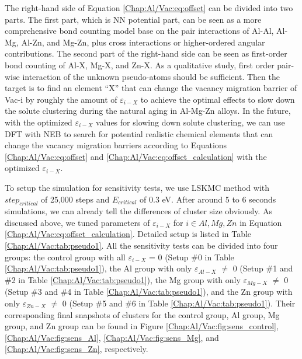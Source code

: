 The right-hand side of Equation \ref{Chap:Al/Vac:eq:offset} can be divided into two parts. The first part, which is \ac{NN} potential part, can be seen as a more comprehensive bond counting model \cite{soisson1996monte} base on the pair interactions of Al-Al, Al-Mg, Al-Zn, and Mg-Zn, plus cross interactions or higher-ordered angular contributions. The second part of the right-hand side can be seen as first-order bond counting of Al-X, Mg-X, and Zn-X. As a qualitative study, first order pair-wise interaction of the unknown pseudo-atoms should be sufficient. Then the target is to find an element ``X'' that can change the vacancy migration barrier of Vac-i by roughly the amount of $\varepsilon_{i-X}$ to achieve the optimal effects to slow down the solute clustering during the natural aging in Al-Mg-Zn alloys. In the future, with the optimized $\varepsilon_{i-X}$ values for slowing down solute clustering, we can use \ac{DFT} with \ac{NEB} to search for potential realistic chemical elements that can change the vacancy migration barriers according to Equations \ref{Chap:Al/Vac:eq:offset} and \ref{Chap:Al/Vac:eq:offset_calculation} with the optimized $\varepsilon_{i-X}$.

To setup the simulation for sensitivity tests, we use \ac{LSKMC} method with $step_{critical}$ of 25,000 steps and $E_{critical}$ of 0.3 eV. After around 5 to 6 seconds simulations, we can already tell the differences of cluster size obviously. As discussed above, we tuned parameters of $\varepsilon_{i-X}$ for $i \in {Al, Mg, Zn}$ in Equation \ref{Chap:Al/Vac:eq:offset_calculation}. Detailed setup is listed in Table \ref{Chap:Al/Vac:tab:pseudo1}. All the sensitivity tests can be divided into four groups: the control group with all $\varepsilon_{i-X}$ = 0 (Setup \#0 in Table \ref{Chap:Al/Vac:tab:pseudo1}), the Al group with only $\varepsilon_{Al-X}$ $\ne$ 0 (Setup \#1 and \#2 in Table \ref{Chap:Al/Vac:tab:pseudo1}), the Mg group with only $\varepsilon_{Mg-X}$ $\ne$ 0 (Setup \#3 and \#4 in Table \ref{Chap:Al/Vac:tab:pseudo1}), and the Zn group with only $\varepsilon_{Zn-X}$ $\ne$ 0 (Setup \#5 and \#6 in Table \ref{Chap:Al/Vac:tab:pseudo1}). Their corresponding final snapshots of clusters for the control group, Al group, Mg group, and Zn group can be found in Figure \ref{Chap:Al/Vac:fig:sens_control}, \ref{Chap:Al/Vac:fig:sens_Al}, \ref{Chap:Al/Vac:fig:sens_Mg}, and \ref{Chap:Al/Vac:fig:sens_Zn}, respectively. 


